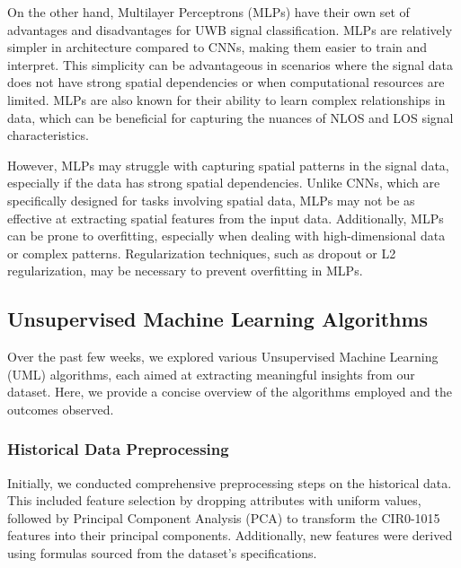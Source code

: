 On the other hand, Multilayer Perceptrons (MLPs) have their own set of advantages and disadvantages for UWB signal classification. MLPs are relatively simpler in architecture compared to CNNs, making them easier to train and interpret. This simplicity can be advantageous in scenarios where the signal data does not have strong spatial dependencies or when computational resources are limited. MLPs are also known for their ability to learn complex relationships in data, which can be beneficial for capturing the nuances of NLOS and LOS signal characteristics.

However, MLPs may struggle with capturing spatial patterns in the signal data, especially if the data has strong spatial dependencies. Unlike CNNs, which are specifically designed for tasks involving spatial data, MLPs may not be as effective at extracting spatial features from the input data. Additionally, MLPs can be prone to overfitting, especially when dealing with high-dimensional data or complex patterns. Regularization techniques, such as dropout or L2 regularization, may be necessary to prevent overfitting in MLPs.




\subsection{Unsupervised Machine Learning Algorithms}\label{uml}

Over the past few weeks, we explored various Unsupervised Machine Learning (UML) algorithms, each aimed at extracting meaningful insights from our dataset. Here, we provide a concise overview of the algorithms employed and the outcomes observed.

\subsubsection{Historical Data Preprocessing}

Initially, we conducted comprehensive preprocessing steps on the historical data. This included feature selection by dropping attributes with uniform values, followed by Principal Component Analysis (PCA) to transform the CIR0-1015 features into their principal components. Additionally, new features were derived using formulas sourced from the dataset's specifications.

